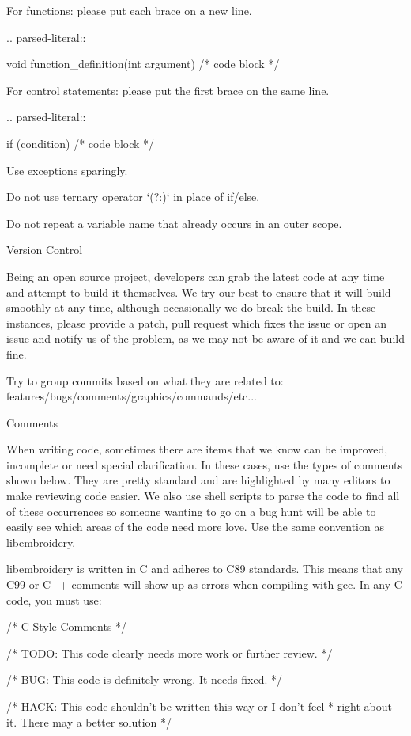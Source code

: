 \documentclass[a4paper]{report}
\begin{document}
{For functions: please put each brace on a new line.

.. parsed-literal::

    void
	function_definition(int argument)
    {
        /* code block */
    }

For control statements: please put the first brace on the same line.

.. parsed-literal::

    if (condition) {
        /* code block */    
    }

Use exceptions sparingly.

Do not use ternary operator `(?:)` in place of if/else.

Do not repeat a variable name that already occurs in an outer scope.

Version Control
~~~~~~~~~~~~~~~

Being an open source project, developers can grab the latest code at any time
and attempt to build it themselves. We try our best to ensure that it will build smoothly
at any time, although occasionally we do break the build. In these instances,
please provide a patch, pull request which fixes the issue or open an issue and
notify us of the problem, as we may not be aware of it and we can build fine.

Try to group commits based on what they are related to: features/bugs/comments/graphics/commands/etc...

Comments
~~~~~~~~

When writing code, sometimes there are items that we know can be improved,
incomplete or need special clarification. In these cases, use the types of
comments shown below. They are pretty standard and are highlighted by many editors to
make reviewing code easier. We also use shell scripts to parse the code to find
all of these occurrences so someone wanting to go on a bug hunt will be able to
easily see which areas of the code need more love. Use the same convention
as libembroidery.

libembroidery is written in C and adheres to C89 standards. This means
that any C99 or C++ comments will show up as errors when compiling with
gcc. In any C code, you must use:

    /* C Style Comments */

    /* TODO: This code clearly needs more work or further review. */

    /* BUG: This code is definitely wrong. It needs fixed. */

    /* HACK: This code shouldn't be written this way or I don't feel
      * right about it. There may a better solution */

}
\end{document}

